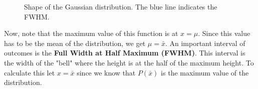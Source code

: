         \begin{figure}[H]
            \centering
            \caption{Shape of the Gaussian distribution. The blue line indicates the FWHM.}
            \label{fig:gaussian}
        \end{figure}
\newpage
        Now, note that the maximum value of this function is at $x=\mu$. Since this value has to be the mean of the distribution, we get $\mu = \bar{x}$. An important interval of outcomes is the \textbf{Full Width at Half Maximum (FWHM)}. This interval is the width of the "bell" where the height is at the half of the maximum height. To calculate this let $x=\bar{x}$ since we know that $P(\bar{x})$ is the maximum value of the distribution.
